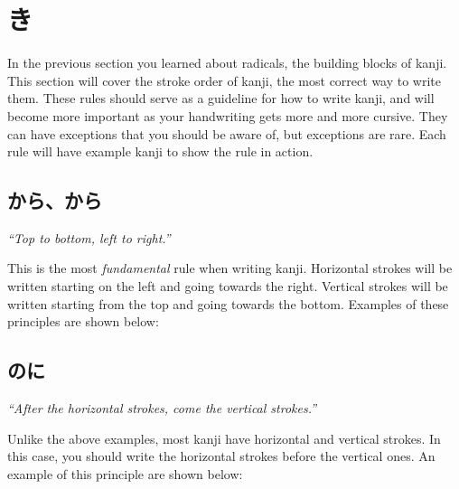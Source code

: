 \section[書き順]{き}\label{sec:PR;漢字;書き順}

In the previous section you learned about radicals, the building blocks of kanji. This section will cover the stroke order of kanji, the most correct way to write them. These rules should serve as a guideline for how to write kanji, and will become more important as your handwriting gets more and more cursive. They can have exceptions that you should be aware of, but exceptions are rare. Each rule will have example kanji to show the rule in action.

\subsection*{から、から}\label{ssec:PR;漢字;書き順;上から下左から右}

\hspace*{24pt}\textit{``Top to bottom, left to right.''}

This is the most \textit{fundamental} rule when writing kanji. Horizontal strokes will be written starting on the left and going towards the right. Vertical strokes will be written starting from the top and going towards the bottom. Examples of these principles are shown below:

\begin{figure}[H]\label{fig:PR;漢字;書き順;上から下左から右}
	\centering
	
	\hspace{0.5in}
	
\end{figure}

\subsection*{のに}\label{ssec:PR;漢字;書き順;横の後に縦}

\hspace*{24pt}\textit{``After the horizontal strokes, come the vertical strokes.''}

Unlike the above examples, most kanji have horizontal and vertical strokes. In this case, you should write the horizontal strokes before the vertical ones. An example of this principle are shown below:


